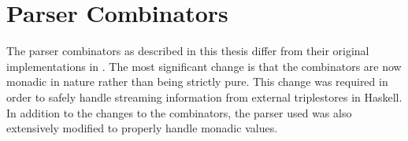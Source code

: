 \documentclass[../main.tex]{subfiles}
\begin{document}
\chapter{Parser Combinators}

The parser combinators as described in this thesis differ from their original implementations
in \cite{frost2014demonstration} \cite{frostagbola2014}.  The most significant change is that
the combinators are now monadic in nature rather than being strictly pure.  This change was
required in order to safely handle streaming information from external triplestores in Haskell.
In addition to the changes to the combinators, the parser used \cite{frosthafiz2008} was also
extensively modified to properly handle monadic values.
\end{document}
